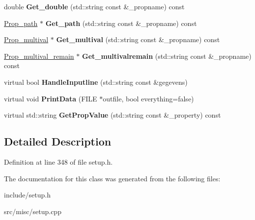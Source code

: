 \begin{DoxyCompactItemize}
\item 
\hypertarget{classSection__prop_ac7dd360e460d869bdcaa531693249a22}{double {\bfseries Get\-\_\-double} (std\-::string const \&\-\_\-propname) const }\label{classSection__prop_ac7dd360e460d869bdcaa531693249a22}

\item 
\hypertarget{classSection__prop_a8522e241de9dfcf71331b6f1dbc16841}{\hyperlink{classProp__path}{Prop\-\_\-path} $\ast$ {\bfseries Get\-\_\-path} (std\-::string const \&\-\_\-propname) const }\label{classSection__prop_a8522e241de9dfcf71331b6f1dbc16841}

\item 
\hypertarget{classSection__prop_a4471da0d01d645126b419f3698b2975c}{\hyperlink{classProp__multival}{Prop\-\_\-multival} $\ast$ {\bfseries Get\-\_\-multival} (std\-::string const \&\-\_\-propname) const }\label{classSection__prop_a4471da0d01d645126b419f3698b2975c}

\item 
\hypertarget{classSection__prop_abbb6160985f12a56526911ab1de6f8ed}{\hyperlink{classProp__multival__remain}{Prop\-\_\-multival\-\_\-remain} $\ast$ {\bfseries Get\-\_\-multivalremain} (std\-::string const \&\-\_\-propname) const }\label{classSection__prop_abbb6160985f12a56526911ab1de6f8ed}

\item 
\hypertarget{classSection__prop_aa18fa3fb45cdc41e54a15f1416a43914}{virtual bool {\bfseries Handle\-Inputline} (std\-::string const \&gegevens)}\label{classSection__prop_aa18fa3fb45cdc41e54a15f1416a43914}

\item 
\hypertarget{classSection__prop_aa49bc0d729b288d862e1db9cfc6e107c}{virtual void {\bfseries Print\-Data} (F\-I\-L\-E $\ast$outfile, bool everything=false)}\label{classSection__prop_aa49bc0d729b288d862e1db9cfc6e107c}

\item 
\hypertarget{classSection__prop_a6b6444bff385109361d271103aafdd4e}{virtual std\-::string {\bfseries Get\-Prop\-Value} (std\-::string const \&\-\_\-property) const }\label{classSection__prop_a6b6444bff385109361d271103aafdd4e}

\end{DoxyCompactItemize}


\subsection{Detailed Description}


Definition at line 348 of file setup.\-h.



The documentation for this class was generated from the following files\-:\begin{DoxyCompactItemize}
\item 
include/setup.\-h\item 
src/misc/setup.\-cpp\end{DoxyCompactItemize}
